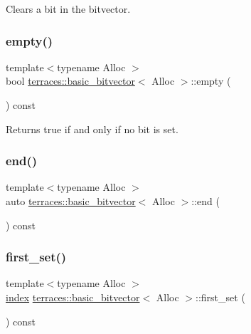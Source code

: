 Clears a bit in the bitvector. \mbox{\label{classterraces_1_1basic__bitvector_afe730070283b54ea7013300950488eea}} 
\subsubsection{\texorpdfstring{empty()}{empty()}}
{\footnotesize\ttfamily template$<$typename Alloc $>$ \\
bool \hyperlink{classterraces_1_1basic__bitvector}{terraces\+::basic\+\_\+bitvector}$<$ Alloc $>$\+::empty (\begin{DoxyParamCaption}{ }\end{DoxyParamCaption}) const}

Returns true if and only if no bit is set. \mbox{\label{classterraces_1_1basic__bitvector_aab7b24b23810e5eda52a99145057d75d}} 
\subsubsection{\texorpdfstring{end()}{end()}}
{\footnotesize\ttfamily template$<$typename Alloc $>$ \\
auto \hyperlink{classterraces_1_1basic__bitvector}{terraces\+::basic\+\_\+bitvector}$<$ Alloc $>$\+::end (\begin{DoxyParamCaption}{ }\end{DoxyParamCaption}) const}

\mbox{\label{classterraces_1_1basic__bitvector_a43d7e193d6ce2d937039af566f480a74}} 
\subsubsection{\texorpdfstring{first\+\_\+set()}{first\_set()}}
{\footnotesize\ttfamily template$<$typename Alloc $>$ \\
\hyperlink{namespaceterraces_adbc33ccb543d1634e96d0eb02e472c77}{index} \hyperlink{classterraces_1_1basic__bitvector}{terraces\+::basic\+\_\+bitvector}$<$ Alloc $>$\+::first\+\_\+set (\begin{DoxyParamCaption}{ }\end{DoxyParamCaption}) const}

